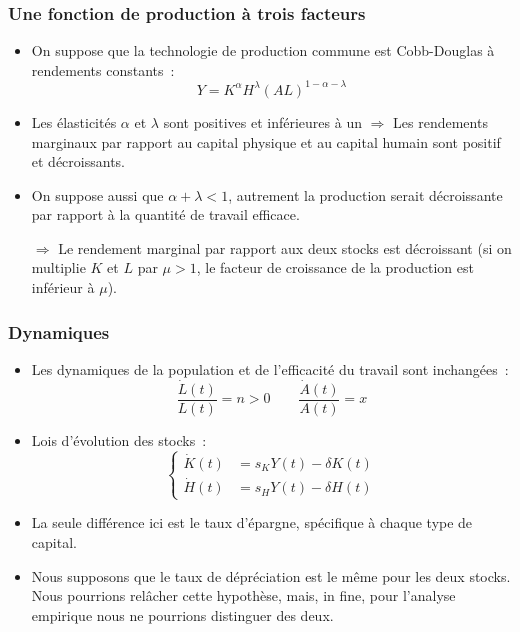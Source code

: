\documentclass[10pt,notheorems]{beamer}
\theoremstyle{plain}
\theoremstyle{definition} %
\begin{document}
\begin{frame}
  \frametitle{Une fonction de production à trois facteurs}

  \begin{itemize}

  \item On suppose que la technologie de production commune est Cobb-Douglas à rendements constants~:
    \medskip
    \[
      Y = K^{\alpha}H^{\lambda}\left(AL\right)^{1-\alpha-\lambda}
    \]
    \medskip

  \item Les élasticités $\alpha$ et $\lambda$ sont positives et inférieures à un $\Rightarrow$ Les rendements marginaux par rapport au capital physique et au capital humain sont positif et décroissants.\newline

  \item On suppose aussi que $\alpha+\lambda<1$, autrement la production serait décroissante par rapport à la quantité de travail efficace.\newline

  \item[$\Rightarrow$] Le rendement marginal par rapport aux deux stocks est décroissant (si on multiplie $K$ et $L$ par $\mu>1$, le facteur de croissance de la production est inférieur à $\mu$).

  \end{itemize}

\end{frame}



\begin{frame}
  \frametitle{Dynamiques}

  \begin{itemize}

  \item Les dynamiques de la population et de l'efficacité du travail sont inchangées~:
    \[
      \frac{\dot L(t)}{L(t)} = n >0 \quad\quad \frac{\dot A(t)}{A(t)} = x
    \]

    \medskip

  \item Lois d'évolution des stocks~:
    \[
      \begin{cases}
        \dot K(t) &= s_K Y(t) - \delta K(t)\\
        \dot H(t) &= s_H Y(t) - \delta H(t)
      \end{cases}
    \]

  \item La seule différence ici est le taux d'épargne, spécifique à chaque type de capital.\newline

  \item Nous supposons que le taux de dépréciation est le même pour les deux stocks. Nous pourrions relâcher cette hypothèse, mais, in fine, pour l'analyse empirique nous ne pourrions distinguer des deux.

  \end{itemize}

\end{frame}
\end{document}
